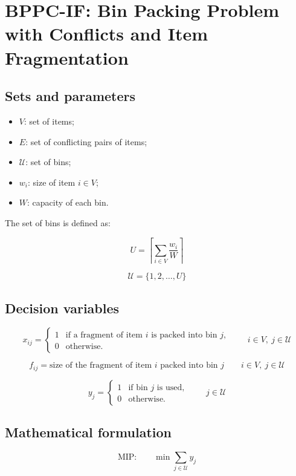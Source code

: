 \documentclass{article}
\begin{document}
\section{BPPC-IF: Bin Packing Problem with Conflicts and Item Fragmentation}

\subsection{Sets and parameters}

\begin{itemize}
    \item $V$: set of items;
    \item $E$: set of conflicting pairs of items;
    \item $\mathcal{U}$: set of bins;
    \item $w_i$: size of item $i \in V$;
    \item $W$: capacity of each bin.
\end{itemize}

The set of bins is defined as:

\[
U = \left\lceil \sum_{i \in V} \frac{w_i}{W} \right\rceil
\]

\[
\mathcal{U} = \{1,2,\ldots,U\}
\]

\subsection{Decision variables}

\[
x_{ij} =
\begin{cases}
1 & \text{if a fragment of item } i
\text{ is packed into bin } j,\\
0 & \text{otherwise.}
\end{cases}
\qquad i \in V,\ j \in \mathcal{U}
\]

\[
f_{ij} = \text{size of the fragment of item } i
\text{ packed into bin } j
\qquad i \in V,\ j \in \mathcal{U}
\]

\[
y_j =
\begin{cases}
1 & \text{if bin } j \text{ is used},\\
0 & \text{otherwise.}
\end{cases}
\qquad j \in \mathcal{U}
\]

\subsection{Mathematical formulation}

\begin{equation}
\text{MIP:} \qquad
\min \sum_{j \in \mathcal{U}} y_j
\end{equation}
\end{document}
